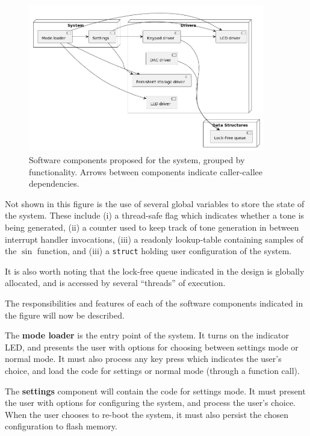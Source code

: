 \documentclass[11pt,a4paper,twocolumn]{scrartcl}
\begin{document}
\begin{figure}
   \centering
   \includegraphics[width=0.92\textwidth]{software_components}
   \caption{Software components proposed for the system, grouped by functionality. Arrows between components indicate caller-callee dependencies.}
   \label{fig:software_components}
\end{figure}

Not shown in this figure is the use of several global variables to store the state of the system. These include 
(i) a thread-safe flag which indicates whether a tone is being generated,
(ii) a counter used to keep track of tone generation in between interrupt handler invocations,
(iii) a readonly lookup-table containing samples of the $\sin$ function, and
(iii) a \verb!struct! holding user configuration of the system.

It is also worth noting that the lock-free queue indicated in the design is globally allocated, and is accessed by several ``threads'' of execution.

The responsibilities and features of each of the software components indicated in the figure will now be described.

The \textbf{mode loader} is the entry point of the system. It turns on the indicator LED, and presents the user with options for choosing between settings mode or normal mode. It must also process any key press which indicates the user's choice, and load the code for settings or normal mode (through a function call).

The \textbf{settings} component will contain the code for settings mode. It must present the user with options for configuring the system, and process the user's choice. When the user chooses to re-boot the system, it must also persist the chosen configuration to flash memory.
\end{document}
